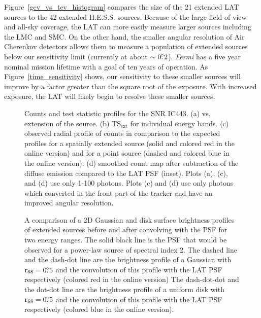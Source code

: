 \documentclass[12pt,preprint]{aastex}
\newif\ifcolorfigure
\newcommand{\gev}{\text{GeV}\xspace}
\newcommand{\tev}{\text{TeV}\xspace}
\newcommand{\tsext}{{\ensuremath{\text{TS}_{\text{ext}}}}\xspace}
\newcommand{\fermi}{\textit{Fermi}\xspace}
\newcommand{\rsixeight}{{\ensuremath{\text{r}_{68}}}\xspace}
\newcommand{\ts}{\text{TS}\xspace}
\begin{document}
Figure~\ref{gev_vs_tev_histogram} compares the size of the 21 extended
LAT sources to the 42 extended H.E.S.S. sources.  Because of the large
field of view and all-sky coverage, the LAT can more easily measure
larger sources including the LMC and SMC.  On the other hand, the smaller
angular resolution of Air Cherenkov detectors allows them to measure a
population of extended sources below our sensitivity limit (currently at
about $\sim0\mbox{$.\!\!^\circ$}2$).  \fermi has a five year nominal mission lifetime with a
goal of ten years of operation.  As Figure~\ref{time_sensitivity} shows,
our sensitivity to these smaller sources will improve by a factor greater
than the square root of the exposure.  With increased exposure, the LAT will likely begin to
resolve these smaller \tev sources.




\clearpage
\begin{figure}
    \ifcolorfigure
    \plotone{ic443_plots/four_plots_ic443_color.eps}
    \else
    \fi
    \caption{
    Counts and test statistic profiles for the SNR IC443. (a) \ts
    vs. extension of the source. (b) \tsext for individual energy
    bands. (c) observed radial profile of counts in comparison to the
    expected profiles for a spatially extended source (solid and colored
    red in the online version) and for a point source (dashed and colored
    blue in the online version).  (d) smoothed count map after subtraction
    of the diffuse emission compared to the LAT PSF (inset).  Plots (a),
    (c), and (d) use only 1-100 \gev photons.  Plots (c) and (d) use
    only photons which converted in the front part of the tracker and
    have an improved angular resolution.
    }
    \label{four_plots_ic443}
\end{figure}

\clearpage
\begin{figure}
    \ifcolorfigure
      \plotone{mc_plots/compare_disk_gauss_color.eps}
    \else
    \fi
    \caption{
    A comparison of a 2D Gaussian and disk surface brightness profiles
    of extended sources before and after convolving with the PSF for two
    energy ranges.  The solid black line is the PSF that would be observed
    for a power-law source of spectral index 2. The dashed line
    and the dash-dot line are 
    the brightness profile of a Gaussian with $\rsixeight=0\fdg5$
    and the convolution of this profile with the LAT PSF respectively
    (colored red in the online version)
    The dash-dot-dot and the dot-dot line are the brightness profile of a uniform disk
    with $\rsixeight=0\fdg5$ and the convolution 
    of this profile with the LAT PSF respectively (colored blue in the online version).
    }\label{compare_disk_gauss}
  \end{figure}
\end{document}

